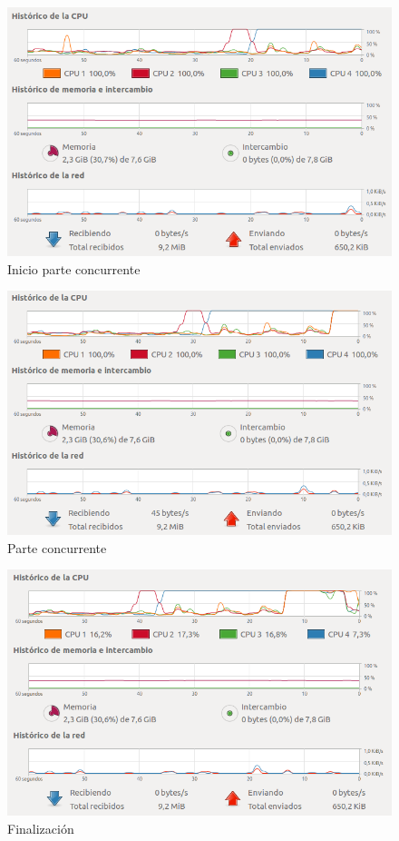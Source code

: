 \documentclass[12pt]{article}
\begin{document}
\begin{figure}[h]
	\centering
	\includegraphics[scale=0.5]{../images/5.png}
	\caption{Inicio parte concurrente}
\end{figure}
\begin{figure}[h]
	\centering
	\includegraphics[scale=0.5]{../images/6.png}
	\caption{Parte concurrente}
\end{figure}
\begin{figure}[h]
	\centering
	\includegraphics[scale=0.5]{../images/7.png}
	\caption{Finalización}
\end{figure}
\end{document}
